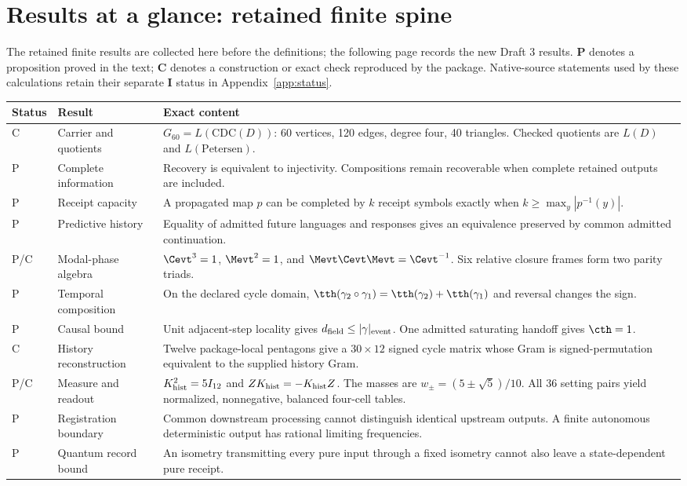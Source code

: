 \section*{Results at a glance: retained finite spine}
The retained finite results are collected here before the definitions; the following page records the new Draft 3 results. \textbf{P} denotes a proposition proved in the text; \textbf{C} denotes a construction or exact check reproduced by the package. Native-source statements used by these calculations retain their separate \textbf{I} status in Appendix~\ref{app:status}.

\noindent\begin{tabularx}{\textwidth}{@{}p{}p{}X@{}}
\toprule
Status & Result & Exact content \\
\midrule
C & Carrier and quotients & $G_{60}=L(\mathrm{CDC}(D))$: 60 vertices, 120 edges, degree four, 40 triangles. Checked quotients are $L(D)$ and $L(\mathrm{Petersen})$. \\[5pt]
P & Complete information & Recovery is equivalent to injectivity. Compositions remain recoverable when complete retained outputs are included. \\[5pt]
P & Receipt capacity & A propagated map $p$ can be completed by $k$ receipt symbols exactly when $k\geq\max_y|p^{-1}(y)|$. \\[5pt]
P & Predictive history & Equality of admitted future languages and responses gives an equivalence preserved by common admitted continuation. \\[5pt]
P/C & Modal-phase algebra & $\Cevt^3=1$, $\Mevt^2=1$, and $\Mevt\Cevt\Mevt=\Cevt^{-1}$. Six relative closure frames form two parity triads. \\[5pt]
P & Temporal composition & On the declared cycle domain, $\tth(\gamma_2\circ\gamma_1)=\tth(\gamma_2)+\tth(\gamma_1)$ and reversal changes the sign. \\[5pt]
P & Causal bound & Unit adjacent-step locality gives $d_{\rm field}\leq|\gamma|_{\rm event}$. One admitted saturating handoff gives $\cth=1$. \\[5pt]
C & History reconstruction & Twelve package-local pentagons give a $30\times12$ signed cycle matrix whose Gram is signed-permutation equivalent to the supplied history Gram. \\[5pt]
P/C & Measure and readout & $K_{\rm hist}^2=5I_{12}$ and $ZK_{\rm hist}=-K_{\rm hist}Z$. The masses are $w_\pm=(5\pm\sqrt5)/10$. All 36 setting pairs yield normalized, nonnegative, balanced four-cell tables. \\[5pt]
P & Registration boundary & Common downstream processing cannot distinguish identical upstream outputs. A finite autonomous deterministic output has rational limiting frequencies. \\[5pt]
P & Quantum record bound & An isometry transmitting every pure input through a fixed isometry cannot also leave a state-dependent pure receipt. \\
\bottomrule
\end{tabularx}

